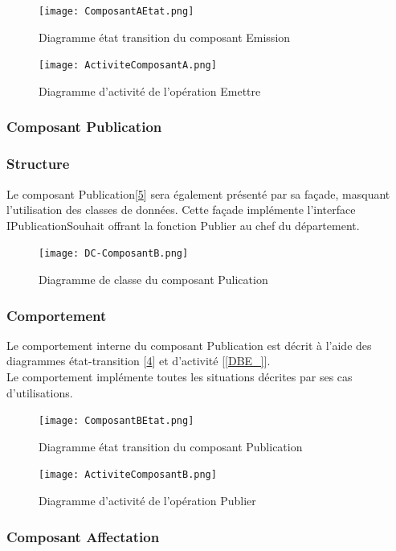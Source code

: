 \documentclass[a4paper,11pt]{article}
\newcommand{\br}{\\\mbox{}}
\begin{document}
\begin{figure}
\centering
\texttt{[image: ComposantAEtat.png]}
\caption{Diagramme état transition du composant Emission}
\label{DAE}
\end{figure}

\begin{figure}
\centering
\texttt{[image: ActiviteComposantA.png]}
\caption{Diagramme d'activité de l'opération Emettre}
\label{DAE_}
\end{figure}






\subsubsection{Composant Publication}
\subsubsection*{Structure}
Le composant Publication[\ref{DBE__}] sera également présenté par sa façade, masquant l'utilisation des classes de données. Cette façade implémente l'interface IPublicationSouhait offrant la fonction Publier au chef du département.

\begin{figure}
\centering
\texttt{[image: DC-ComposantB.png]}
\caption{Diagramme de classe du composant Pulication}
\label{DBE__}
\end{figure}

\subsubsection*{Comportement}
Le comportement interne du composant Publication est décrit à l'aide des diagrammes état-transition [\ref{DBE}] et d'activité [\ref{DBE_}].\br
Le comportement implémente toutes les situations décrites par ses cas d'utilisations.
\begin{figure}
\centering
\texttt{[image: ComposantBEtat.png]}
\caption{Diagramme état transition du composant Publication}
\label{DBE}
\end{figure}

\begin{figure}
\centering
\texttt{[image: ActiviteComposantB.png]}
\caption{Diagramme d'activité de l'opération Publier}
\label{DBE__}
\end{figure}

\subsubsection{Composant Affectation}
\end{document}
